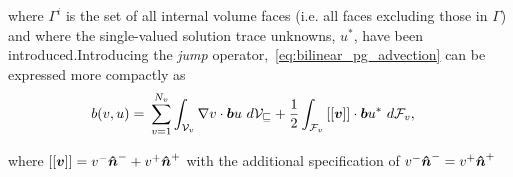 where $\Gamma^i$ is the set of all internal volume faces (i.e. all faces excluding those in $\Gamma$) and where the
single-valued solution trace unknowns, $u^*$, have been introduced.Introducing the \textit{jump}
operator,~\eqref{eq:bilinear_pg_advection} can be expressed more compactly as
\begin{align}
b(v,u) 
=\ & \sum_{v=1}^{N_v} \int_{\fe{V}_v} \nabla v \cdot \varv{b} u\ d\fe{V_v}
+ \frac{1}{2} \int_{\fe{F}_v} \jump{\varv{v}} \cdot \varv{b} u^*\ d\fe{F}_v, \label{eq:bilinear_pg_advection_jump}
\end{align}

where ${\left[\left[\mathit{\bm{{v}}}\right]\right]} = v^- \mathit{\bm{{\hat{n}}}}^- + v^+ \mathit{\bm{{\hat{n}}}}^+$ with the additional specification of $v^-
\mathit{\bm{{\hat{n}}}}^- = v^+ \mathit{\bm{{\hat{n}}}}^+$ 



